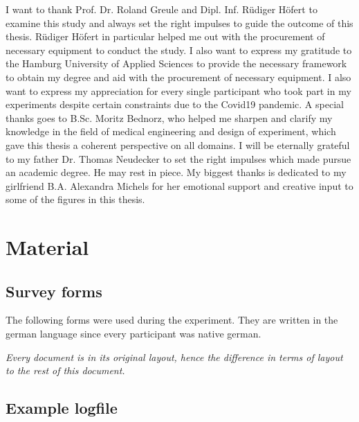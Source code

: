        I want to thank Prof. Dr. Roland Greule and Dipl. Inf. Rüdiger Höfert to examine this study and always set the right impulses to guide the outcome of this thesis. Rüdiger Höfert in particular helped me out with the procurement of necessary equipment to conduct the study. I also want to express my gratitude to the Hamburg University of Applied Sciences to provide the necessary framework to obtain my degree and aid with the procurement of necessary equipment. I also want to express my appreciation for every single participant who took part in my experiments despite certain constraints due to the Covid19 pandemic.
        A special thanks goes to B.Sc. Moritz Bednorz, who helped me sharpen and clarify my knowledge in the field of medical engineering and design of experiment, which gave this thesis a coherent perspective on all domains. 
        I will be eternally grateful to my father Dr. Thomas Neudecker to set the right impulses which made pursue an academic degree. He may rest in piece. 
        My biggest thanks is dedicated to my girlfriend B.A. Alexandra Michels for her emotional support and creative input to some of the figures in this thesis.

    \appendix

        \chapter{Material}

            \section{Survey forms}\label{surveys}

                The following forms were used during the experiment. They are written in the german language since every participant was native german. 

                \medskip

                \textit{Every document is in its original layout, hence the difference in terms of layout to the rest of this document.}


                \label{consent}
                \label{q-prior}
                \label{q-post}

            \section{Example logfile}\label{logfile}                

